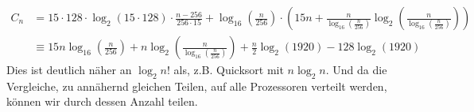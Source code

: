 			\begin{equation}
				\begin{aligned}
					C_n&=15\cdot 128\cdot\log_2\left(15\cdot 128\right)\cdot \frac{n-256}{256\cdot15}+\log_{16}\left(\frac{n}{256}\right)\cdot\left(15n+\frac{n}{\log_{16}\left(\frac{n}{256}\right)}\log_2\left(\frac{n}{\log_{16}\left(\frac{n}{256}\right)}\right)\right)\\
					&\equiv 15n\log_{16}\left(\frac{n}{256}\right)+n\log_{2}\left(\frac{n}{\log_{16}\left(\frac{n}{256}\right)}\right)+\frac{n}{2}\log_2\left(1920\right)-128\log_2\left(1920\right)
				\end{aligned}
			\end{equation}
			Dies ist deutlich näher an $\log_2{n!}$ als, z.B. Quicksort mit $n\log_2{n}$. 
			Und da die Vergleiche, zu annähernd gleichen Teilen, auf alle Prozessoren verteilt werden, können wir durch dessen Anzahl teilen.
			
